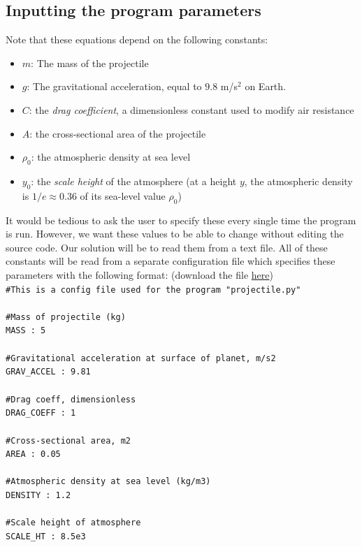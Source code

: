 \documentclass{article}
\begin{document}
\subsection*{Inputting the program parameters}
Note that these equations depend on the following constants:
\begin{itemize}
	\item $m$: The mass of the projectile
	\item $g$: The gravitational acceleration, equal to $9.8$ m/s$^2$ on Earth.
	\item $C$: the \textit{drag coefficient}, a dimensionless constant used to modify air resistance
	\item $A$: the cross-sectional area of the projectile
	\item $\rho_0$: the atmospheric density at sea level
	\item $y_0$: the \textit{scale height} of the atmosphere (at a height $y$, the atmospheric density is $1/e\approx0.36$ of its sea-level value $\rho_0$)
\end{itemize}
It would be tedious to ask the user to specify these every single time the program is run. However, we want these values to be able to change without editing the source code. Our solution will be to read them from a text file. All of these constants will be read from a separate configuration file which specifies these parameters with the following format: (download the file \href{https://drive.google.com/file/d/1s0viOy4BDs1apgjJRbNgL4hWFWN-P4xL/view?usp=sharing}{here})\\
\texttt{\#This is a config file used for the program "projectile.py"}\\
\texttt{}\\
\texttt{\#Mass of projectile (kg)}\\
\texttt{MASS  	   : 5}\\
\texttt{}\\
\texttt{\#Gravitational acceleration at surface of planet, m/s2}\\
\texttt{GRAV\_ACCEL : 9.81}\\
\texttt{}\\
\texttt{\#Drag coeff, dimensionless}\\
\texttt{DRAG\_COEFF : 1}\\
\texttt{}\\
\texttt{\#Cross-sectional area, m2}\\
\texttt{AREA	   : 0.05}\\
\texttt{}\\
\texttt{\#Atmospheric density at sea level (kg/m3)}\\
\texttt{DENSITY	   : 1.2}\\
\texttt{}\\
\texttt{\#Scale height of atmosphere}\\
\texttt{SCALE\_HT   : 8.5e3}\\
\end{document}
